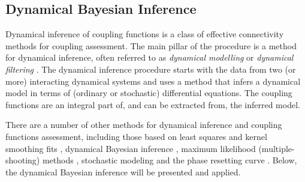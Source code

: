 \documentclass[pre,aps,twocolumn,showpacs]{revtex4}
\newcommand{\red}[1]{{\color{red}{#1}}}
\begin{document}
%
%
%
%
%
%


\subsection{Dynamical Bayesian Inference}\label{sec:DBI}

Dynamical inference of coupling functions is a class of effective connectivity methods for coupling assessment.  The main pillar of the procedure is a method for dynamical inference, often referred to as {\it dynamical modelling} or {\it dynamical filtering} \cite{Toussaint:11,Kalman:60,Arulampalam:02,Voss:04,Stankovski:14c}. The dynamical inference procedure starts with the data from two (or more) interacting dynamical systems and uses a method that infers a dynamical model in terms of (ordinary or stochastic) differential equations. The coupling functions are an integral part of, and can be extracted from, the inferred model.

There are a number of other methods for dynamical inference and coupling functions assessment, including those based on least squares and kernel smoothing fits \cite{Rosenblum:01,Kralemann:13b}, dynamical Bayesian inference \cite{Stankovski:12b}, maximum likelihood (multiple-shooting) methods \cite{Tokuda:07}, stochastic modeling \cite{Schwabedal:10} and the phase resetting curve \cite{Levnajic:11}. Below, the dynamical Bayesian inference \cite{Stankovski:12b} will be presented and applied.
\end{document}
